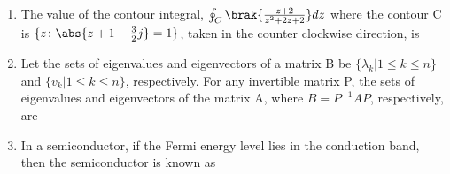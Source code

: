 \documentclass[a4paper, 11pt]{article}
\begin{document}
\begin{enumerate}
    \hfill{}
    
    \item The value of the contour integral, $\oint_C \brak{\frac{z+2}{z^2+2z+2}}dz$ where the contour C is $\{z \colon \abs{z+1-\frac{3}{2}j}=1\}$, taken in the counter clockwise direction, is
    
    \begin{enumerate}
    \end{enumerate}
    
    \hfill{}
    
    \item Let the sets of eigenvalues and eigenvectors of a matrix B be $\{\lambda_k | 1 \le k \le n\}$ and $\{v_k | 1 \le k \le n\}$, respectively. For any invertible matrix P, the sets of eigenvalues and eigenvectors of the matrix A, where $B = P^{-1}AP$, respectively, are
    
    \begin{enumerate}
    \end{enumerate}
    
    \hfill{}
    
    \item In a semiconductor, if the Fermi energy level lies in the conduction band, then the semiconductor is known as
    
    \begin{enumerate}
    \end{enumerate}
    

\end{enumerate}
\end{document}
